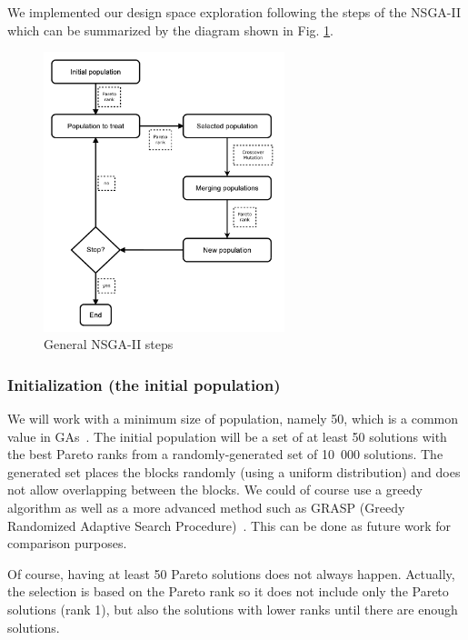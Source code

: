 We implemented our design space exploration following the steps of the NSGA-II which can be summarized by the diagram shown in Fig. \ref{fig:ga_steps}.

\begin{figure}[h!]
\begin{center}
\includegraphics[width=7cm]{GA_dia_en.pdf}
\end{center}
\vspace{-0.5cm}
\caption{General NSGA-II steps}
\begin{center}
\end{center}
\label{fig:ga_steps}
\end{figure}

\subsubsection*{Initialization (the initial population)}
We will work with a minimum size of population, namely 50, which is a common value in GAs~\cite{Davis1989}. The initial population will be a set of at least 50 solutions with the best Pareto ranks from a randomly-generated set of 10~000 solutions. The generated set places the blocks randomly (using a uniform distribution) and does not allow overlapping between the blocks. We could of course use a greedy algorithm as well as a more advanced method such as GRASP (Greedy Randomized Adaptive Search Procedure)~\cite{HarSho87a}. This can be done as future work for comparison purposes.

Of course, having at least 50 Pareto solutions does not always happen. Actually, the selection is based on the Pareto rank so it does not include only the Pareto solutions (rank 1), but also the solutions with lower ranks until there are enough solutions.

